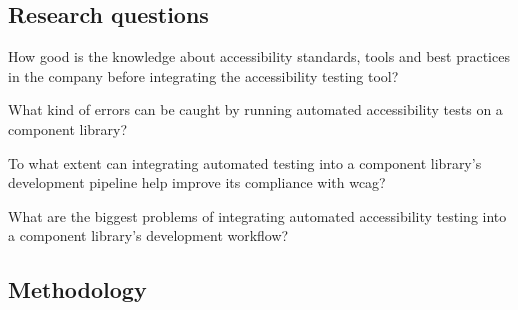 \documentclass{master_thesis}
\begin{document}

\subsection{Research questions}

	\begin{RQlist}
		\item How good is the knowledge about accessibility standards, tools and best practices in the company before integrating the accessibility testing tool?
		\item What kind of errors can be caught by running automated accessibility tests on a component library?
		\item To what extent can integrating automated testing into a component library's development pipeline help improve its compliance with \ac{wcag}?
		\item What are the biggest problems of integrating automated accessibility testing into a component library's development workflow?
	\end{RQlist}

\subsection{Methodology}



\end{document}
